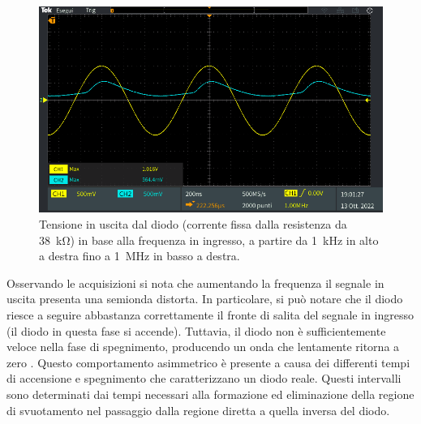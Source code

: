 \begin{figure}[!ht]
\begin{minipage}{.496\textwidth}
	\end{minipage}
	\begin{minipage}{.496\textwidth}
		\includegraphics[width=\linewidth]{./ImageFiles/Laboratorio 2/TEK00014.PNG}
	\end{minipage}
	\caption{Tensione in uscita dal diodo (corrente fissa dalla resistenza da \SI{38}{\kilo\ohm}) in base alla frequenza in ingresso, a partire da \SI{1}{\kilo\hertz} in alto a destra fino a \SI{1}{\mega\hertz} in basso a destra.}
	\label{fig:freqwith38}
\end{figure}
Osservando le acquisizioni si nota che aumentando la frequenza il segnale in uscita presenta una semionda distorta. In particolare, si può notare che il diodo riesce a seguire abbastanza correttamente il fronte di salita del segnale in ingresso (il diodo in questa fase si accende). Tuttavia, il diodo non è sufficientemente veloce nella fase di spegnimento, producendo un onda che lentamente ritorna a zero . Questo comportamento asimmetrico è presente a causa dei differenti tempi di accensione e spegnimento che caratterizzano un diodo reale. Questi intervalli sono determinati dai tempi necessari alla formazione ed eliminazione della regione di svuotamento nel passaggio dalla regione diretta a quella inversa del diodo.  

